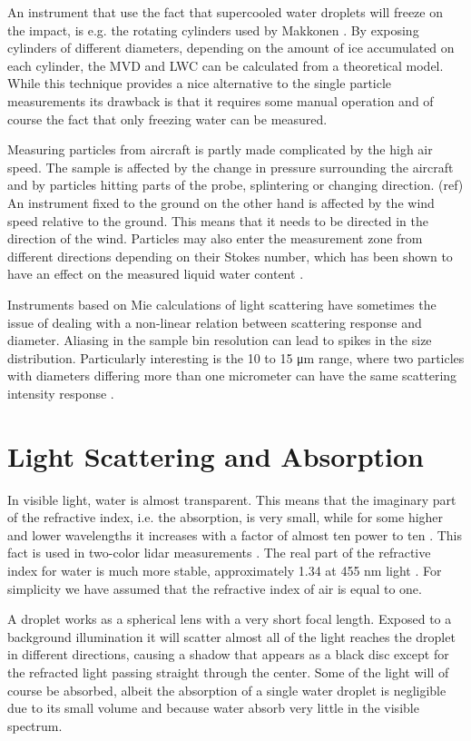 An instrument that use the fact that supercooled water droplets will freeze on the impact, is e.g. the rotating cylinders used by Makkonen \cite{makk1992}. By exposing cylinders of different diameters, depending on the amount of ice accumulated on each cylinder, the MVD and LWC can be calculated from a theoretical model. While this technique provides a nice alternative to the single particle measurements its drawback is that it requires some manual operation and of course the fact that only freezing water can be measured.

Measuring particles from aircraft is partly made complicated by the high air speed. The sample is affected by the change in pressure surrounding the aircraft and by particles hitting parts of the probe, splintering or changing direction. (ref) An instrument fixed to the ground on the other hand is affected by the wind speed relative to the ground. This means that it needs to be directed in the direction of the wind. Particles may also enter the measurement zone from different directions depending on their Stokes number, which has been shown to have an effect on the measured liquid water content \cite{henn2013}.

Instruments based on Mie calculations of light scattering have sometimes the issue of dealing with a non-linear relation between scattering response and diameter. Aliasing in the sample bin resolution can lead to spikes in the size distribution. Particularly interesting is the 10 to 15 μm range, where two particles with diameters differing more than one micrometer can have the same scattering intensity response \cite{dye1984,spie2012,bohr2008}.

\section{Light Scattering and Absorption}

In visible light, water is almost transparent. This means that the imaginary part of the refractive index, i.e. the absorption, is very small, while for some higher and lower wavelengths it increases with a factor of almost ten power to ten \cite{kou1993}. This fact is used in two-color lidar measurements \cite{west2010}. The real part of the refractive index for water is much more stable, approximately 1.34 at 455 nm light \cite{hale1973}. For simplicity we have assumed that the refractive index of air is equal to one. 

A droplet works as a spherical lens with a very short focal length. Exposed to a background illumination it will scatter almost all of the light reaches the droplet in different directions, causing a shadow that appears as a black disc except for the refracted light passing straight through the center. Some of the light will of course be absorbed, albeit the absorption of a single water droplet is negligible due to its small volume and because water absorb very little in the visible spectrum.

